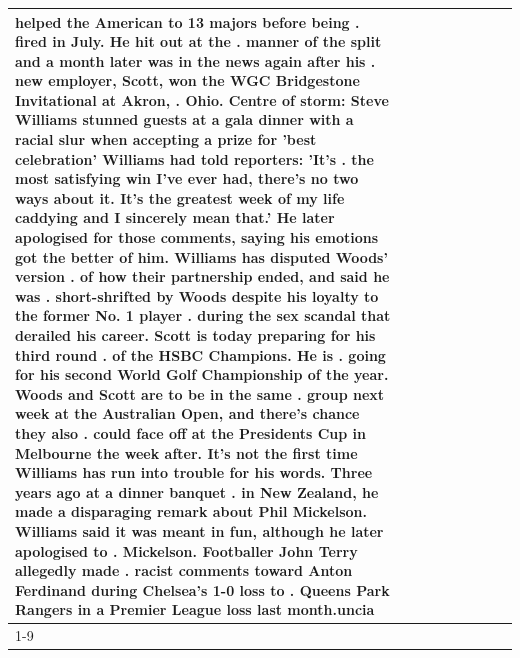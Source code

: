 \begin{table}[H]
\begin{tabular}{lllrlllll}
helped the American to 13 majors before being . fired in July. He hit out at the . manner of the split and a month later was in the news again after his . new employer, Scott, won the WGC Bridgestone Invitational at Akron, . Ohio. Centre of storm: Steve Williams stunned guests at a gala dinner with a racial slur when accepting a prize for 'best celebration' Williams had told reporters: 'It's . the most satisfying win I've ever had, there's no two ways about it. It's the greatest week of my life caddying and I sincerely mean that.' He later apologised for those comments, saying his emotions got the better of him. Williams has disputed Woods' version . of how their partnership ended, and said he was . short-shrifted by Woods despite his loyalty to the former No. 1 player . during the sex scandal that derailed his career. Scott is today preparing for his third round . of the HSBC Champions. He is . going for his second World Golf Championship of the year. Woods and Scott are to be in the same . group next week at the Australian Open, and there's chance they also . could face off at the Presidents Cup in Melbourne the week after. It's not the first time Williams has run into trouble for his words. Three years ago at a dinner banquet . in New Zealand, he made a disparaging remark about Phil Mickelson. Williams said it was meant in fun, although he later apologised to . Mickelson. Footballer John Terry allegedly made . racist comments toward Anton Ferdinand during Chelsea's 1-0 loss to . Queens Park Rangers in a Premier League loss last month.uncia \\
\cline{1-9}

\end{tabular}
\end{table}
